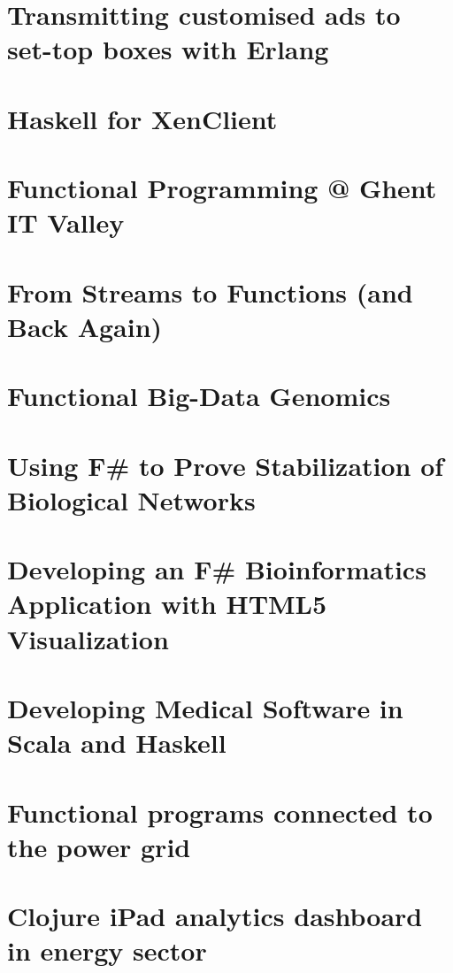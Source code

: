 \documentclass{jfp1}
\begin{document}
\section{Transmitting customised ads to set-top boxes with Erlang}

\section{Haskell for XenClient}

\section{Functional Programming @ Ghent IT Valley}


\section{From Streams to Functions (and Back Again)}

\section{Functional Big-Data Genomics}

\section{Using F\# to Prove Stabilization of Biological Networks}

\section{Developing an F\# Bioinformatics Application with HTML5
  Visualization}

\section{Developing Medical Software in Scala and Haskell}

\section{Functional programs connected to the power grid}

\section{Clojure iPad analytics dashboard in energy sector}
\end{document}
